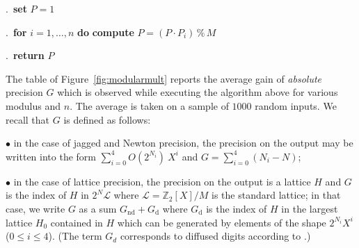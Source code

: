 \documentclass{sig-alternate-05-2015}
\newcommand{\Z}{\mathbb Z}
\renewcommand{\mod}{\,\%\,}
\begin{document}
\noindent\hrulefill

%

.\ {\bf set} $P = 1$

.\ {\bf for} $i=1,\dots,n$ {\bf do} {\bf compute} $P = (P 
\cdot P_i) \mod M$

.\ {\bf return} $P$

\vspace{-1ex}\noindent\hrulefill

\medskip

The table of Figure~\ref{fig:modularmult} reports the average gain of 
\emph{absolute} precision $G$ which is observed while executing the 
algorithm above for various modulus and $n$. The average is taken on a 
sample of $1000$ random inputs. We recall that $G$ is defined as 
follows:

\noindent $\bullet$
in the case of jagged and Newton precision, the precision on the output 
may be written into the form $\sum_{i=0}^4 O(2^{N_i}) \: X^i$ and 
$G = \sum_{i=0}^4 (N_i - N)$;

\noindent $\bullet$
in the case of lattice precision, the precision on the output is a 
lattice $H$ and $G$ is the index of $H$ in $2^N \mathcal L$ where 
$\mathcal L = \Z_2[X]/M$ is the standard lattice; in that case, we write 
$G$ as a sum $G_{\text{nd}} + G_{\text{d}}$ where $G_{\text{d}}$ is the 
index of $H$ in the largest lattice $H_0$ contained in $H$ which can be 
generated by elements of the shape $2^{N_i} X^i$ ($0 \leq i \leq 4$). 
(The term $G_d$ corresponds to diffused digits according to 
\cite[Definition~2.3]{caruso-roe-vaccon:15a}.)
\end{document}
